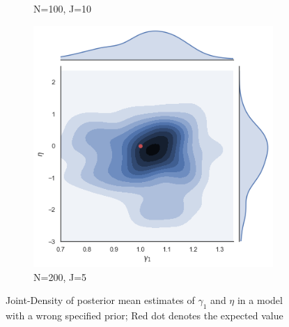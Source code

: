 \begin{figure}[h!]
\begin{subfigure}[b]{0.3\linewidth}
    \caption{N=100, J=10}
  \end{subfigure}
  \begin{subfigure}[b]{0.3\linewidth}
    \includegraphics[width=\linewidth]{graphics/jointplot_gamma1eta_smallJ}
    \caption{ N=200, J=5}
  \end{subfigure}
  \caption{Joint-Density of posterior mean estimates of $\gamma_1$ and $\eta$ in a model with a wrong specified prior;
  Red dot denotes the expected value}
  \label{fig:various sample size}
\end{figure}


